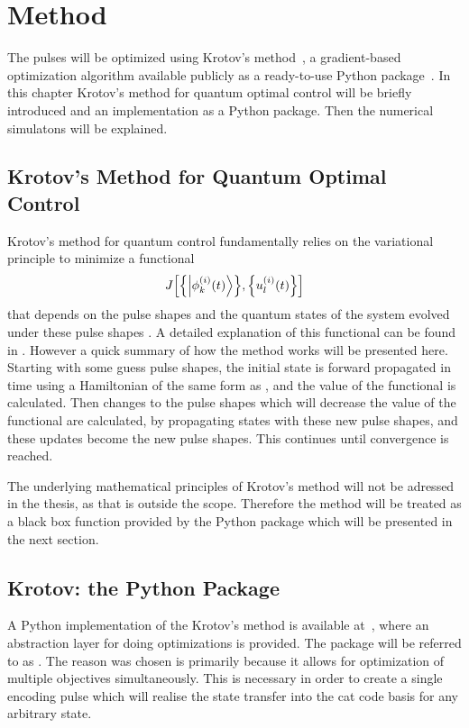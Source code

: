 \documentclass[main.tex]{subfiles}
\begin{document}
\chapter{Method}
The pulses will be optimized using Krotov's method~\cite{reich_monotonically_2012}, a gradient-based optimization algorithm available publicly as a ready-to-use Python package~\cite{goerz_krotov:_2019}.
In this chapter Krotov's method for quantum optimal control will be briefly introduced and an implementation as a Python package.
Then the numerical simulatons will be explained.

\section{Krotov's Method for Quantum Optimal Control}
Krotov's method for quantum control fundamentally relies on the variational principle to minimize a functional
\[ J\qty[\qty{\ket{\phi^{(i)}_k(t)}},\qty{u_l^{(i)}(t)}] \]
that depends on the pulse shapes and the quantum states of the system evolved under these pulse shapes \cite{goerz_krotov:_2019}.
A detailed explanation of this functional can be found in \cite{reich_monotonically_2012}.
However a quick summary of how the method works will be presented here.
Starting with some guess pulse shapes, the initial state is forward propagated in time using a Hamiltonian of the same form as , and the value of the functional is calculated.
Then changes to the pulse shapes which will decrease the value of the functional are calculated, by propagating states with these new pulse shapes, and these updates become the new pulse shapes.
This continues until convergence is reached.

The underlying mathematical principles of Krotov's method will not be adressed in the thesis, as that is outside the scope.
Therefore the method will be treated as a black box function provided by the Python package which will be presented in the next section.

\section{Krotov: the Python Package}
A Python implementation of the Krotov's method is available at~\cite{goerz_krotov:_2019}, where an abstraction layer for doing optimizations is provided.
The package will be referred to as \krotov{}.
The reason \krotov{} was chosen is primarily because it allows for optimization of multiple objectives simultaneously.
This is necessary in order to create a single encoding pulse which will realise the state transfer into the cat code basis for any arbitrary state.
\end{document}
